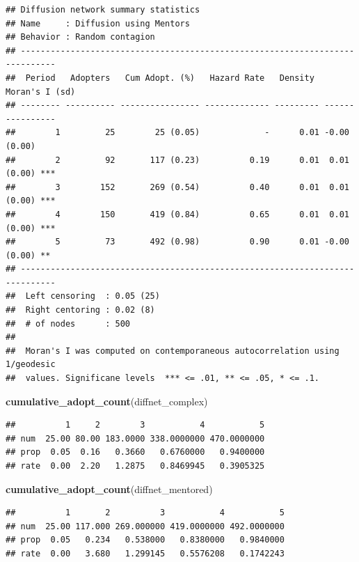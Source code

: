 \documentclass[]{book}
\newenvironment{Shaded}{\begin{snugshade}}{\end{snugshade}}
\newcommand{\KeywordTok}[1]{\textcolor[rgb]{0.13,0.29,0.53}{\textbf{#1}}}
\newcommand{\NormalTok}[1]{#1}
\begin{document}
\begin{verbatim}
## Diffusion network summary statistics
## Name     : Diffusion using Mentors
## Behavior : Random contagion
## -----------------------------------------------------------------------------
##  Period   Adopters   Cum Adopt. (%)   Hazard Rate   Density   Moran's I (sd)  
## -------- ---------- ---------------- ------------- --------- ---------------- 
##        1         25        25 (0.05)             -      0.01 -0.00 (0.00)     
##        2         92       117 (0.23)          0.19      0.01  0.01 (0.00) *** 
##        3        152       269 (0.54)          0.40      0.01  0.01 (0.00) *** 
##        4        150       419 (0.84)          0.65      0.01  0.01 (0.00) *** 
##        5         73       492 (0.98)          0.90      0.01 -0.00 (0.00) **  
## -----------------------------------------------------------------------------
##  Left censoring  : 0.05 (25)
##  Right centoring : 0.02 (8)
##  # of nodes      : 500
## 
##  Moran's I was computed on contemporaneous autocorrelation using 1/geodesic
##  values. Significane levels  *** <= .01, ** <= .05, * <= .1.
\end{verbatim}

\begin{Shaded}
\begin{Highlighting}[]
\KeywordTok{cumulative_adopt_count}\NormalTok{(diffnet_complex)}
\end{Highlighting}
\end{Shaded}

\begin{verbatim}
##          1     2        3           4           5
## num  25.00 80.00 183.0000 338.0000000 470.0000000
## prop  0.05  0.16   0.3660   0.6760000   0.9400000
## rate  0.00  2.20   1.2875   0.8469945   0.3905325
\end{verbatim}

\begin{Shaded}
\begin{Highlighting}[]
\KeywordTok{cumulative_adopt_count}\NormalTok{(diffnet_mentored)}
\end{Highlighting}
\end{Shaded}

\begin{verbatim}
##          1       2          3           4           5
## num  25.00 117.000 269.000000 419.0000000 492.0000000
## prop  0.05   0.234   0.538000   0.8380000   0.9840000
## rate  0.00   3.680   1.299145   0.5576208   0.1742243
\end{verbatim}
\end{document}
